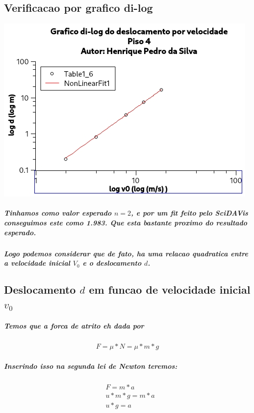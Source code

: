 \documentclass[12pt,twoside, a4paper, twocolumn]{article}
\begin{document}
\subsection{Verificacao por grafico di-log}
\begin{adjustbox}{scale=0.70}
    \includegraphics{Grafico-5.jpg}
\end{adjustbox}

\subparagraph*{Tinhamos como valor esperado $n = 2$, e por um \emph{fit} feito pelo SciDAVis conseguimos este como 1.983. Que esta bastante proximo do resultado esperado.}
\subparagraph*{Logo podemos considerar que de fato, ha uma relacao quadratica entre a velocidade inicial $V_0$ e o deslocamento $d$.}

\subsection{Deslocamento $d$ em funcao de velocidade inicial $v_0$}

\subparagraph*{Temos que a forca de atrito eh dada por}

\begin{equation}
    \begin{aligned}
        F = \mu * N = \mu * m * g
    \end{aligned}
\end{equation}

\subparagraph*{Inserindo isso na segunda lei de Newton teremos:}

\begin{equation}
    \begin{aligned}
         & F      = m*a \\
         & u*m*g  = m*a \\
         & u*g    = a
    \end{aligned}
\end{equation}
\end{document}
